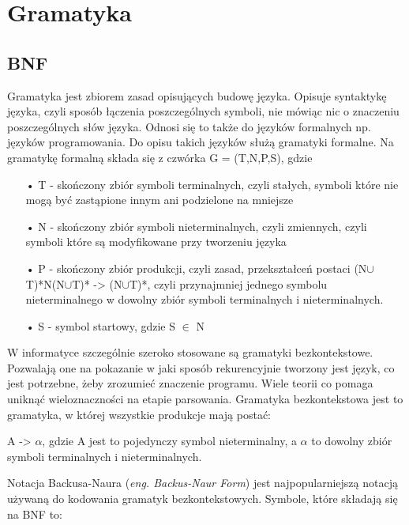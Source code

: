 
\section{Gramatyka}
\label{sec:gramatyka}

\subsection{BNF}
\label{sec:BNF}
Gramatyka jest zbiorem zasad opisujących budowę języka. Opisuje syntaktykę języka, czyli sposób łączenia poszczególnych symboli, nie mówiąc nic o znaczeniu poszczególnych słów języka. Odnosi się to także do języków formalnych np. języków programowania. Do opisu takich języków służą gramatyki formalne. Na gramatykę formalną składa się z czwórka G = (T,N,P,S), gdzie 

\begin{itemize}
  \item[•] T - skończony zbiór symboli terminalnych, czyli stałych, symboli które nie mogą być zastąpione innym ani podzielone na mniejsze 
  \item[•] N - skończony zbiór symboli nieterminalnych, czyli zmiennych, czyli symboli które są modyfikowane przy tworzeniu języka
  \item[•] P - skończony zbiór produkcji, czyli zasad, przekształceń postaci (N$\cup$T)*N(N$\cup$T)* -> (N$\cup$T)*, czyli przynajmniej jednego symbolu nieterminalnego w dowolny zbiór symboli terminalnych i nieterminalnych.
  \item[•] S - symbol startowy, gdzie S $\in$ N
\end{itemize}

W informatyce szczególnie szeroko stosowane są gramatyki bezkontekstowe. Pozwalają one na pokazanie w jaki sposób rekurencyjnie tworzony jest język, co jest potrzebne, żeby zrozumieć znaczenie programu. Wiele teorii co pomaga uniknąć wieloznaczności na etapie parsowania. 
Gramatyka bezkontekstowa jest to gramatyka, w której wszystkie produkcje mają postać:

	A -> {$\alpha$}, \newline
gdzie A jest to pojedynczy symbol nieterminalny, a $\alpha$ to dowolny zbiór symboli terminalnych i nieterminalnych.
	
Notacja Backusa-Naura (\textit{eng. Backus-Naur Form})\cite{Backus1959TheSA}\cite{Naur}\cite{Knuth1964} jest najpopularniejszą notacją używaną do kodowania gramatyk bezkontekstowych. Symbole, które składają się na BNF to:

